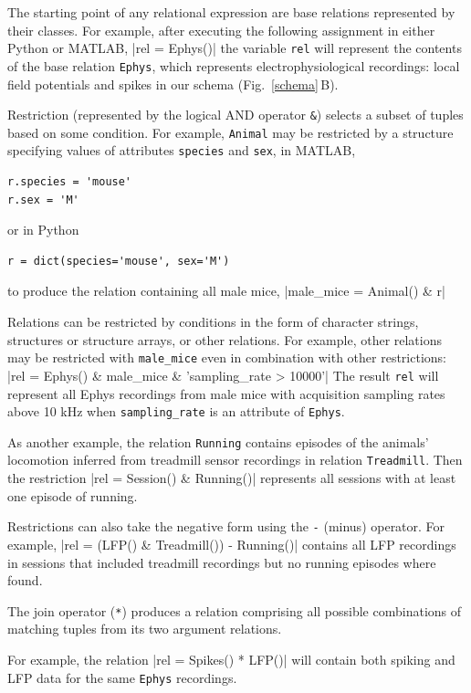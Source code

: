\documentclass[10pt,letterpaper]{article}
\newcommand{\matlab}[1]{\texttt{#1}}
\begin{document}
The starting point of any relational expression are base relations represented by their classes. 
For example, after executing the following assignment in either Python or MATLAB,
|rel = Ephys()|
the variable \matlab{rel} will represent the contents of the base relation \matlab{Ephys}, which represents electrophysiological recordings: local field potentials and spikes in our schema  (Fig.\ \ref{schema}\,B).

Restriction (represented by the logical AND operator {\tt \&}) selects a subset of tuples based on some condition.
For example, \matlab{Animal} may be restricted by a structure specifying values of attributes \matlab{species} and \matlab{sex},
in MATLAB,
\begin{verbatim}
r.species = 'mouse'
r.sex = 'M'
\end{verbatim}
or in Python
\begin{verbatim}
r = dict(species='mouse', sex='M')
\end{verbatim}
to produce the relation containing all male mice,
|male_mice = Animal() & r|

Relations can be restricted by conditions in the form of character strings, structures or structure arrays, or other relations.
For example, other relations may be restricted with \matlab{male_mice} even in combination with other restrictions:
|rel = Ephys() & male_mice & 'sampling_rate > 10000'|
The result \matlab{rel} will represent all Ephys recordings from male mice with acquisition sampling rates above 10 kHz when \matlab{sampling_rate} is an attribute of \matlab{Ephys}.


As another example, the relation \matlab{Running} contains episodes of the animals' locomotion inferred from treadmill sensor recordings in relation \matlab{Treadmill}.
Then the restriction
|rel = Session() & Running()|
represents all sessions with at least one episode of running.

Restrictions can also take the negative form using the \matlab{-} (minus) operator. For example,
|rel = (LFP() & Treadmill()) - Running()|
contains all LFP recordings in sessions that included treadmill recordings but no running episodes where found.

The join operator (\matlab{*}) produces a relation comprising all possible combinations of matching tuples from its two argument relations.

For example, the relation
|rel = Spikes() * LFP()|
will contain both spiking and LFP data for the same \matlab{Ephys} recordings.
\end{document}
